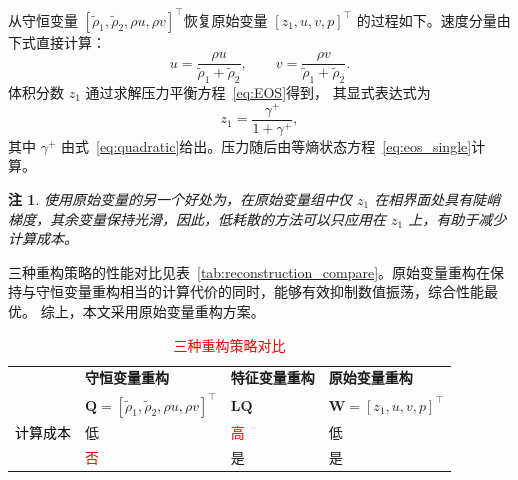 \documentclass[12pt,a4paper]{article}
\newtheorem{remark}[theorem]{注}
\numberwithin{equation}{section}    %
\begin{document}
从守恒变量 $[\tilde{\rho}_1, \tilde{\rho}_2, \rho u, \rho v]^\top$恢复原始变量 $[z_1, u, v, p]^\top$ 的过程如下。速度分量由下式直接计算：
\begin{equation}
    u = \frac{\rho u}{\tilde{\rho}_1 + \tilde{\rho}_2},
    \qquad
    v = \frac{\rho v}{\tilde{\rho}_1 + \tilde{\rho}_2}.
\end{equation}
体积分数 $z_1$ 通过求解压力平衡方程~\eqref{eq:EOS}得到，
其显式表达式为
\begin{equation}
    z_1 = \frac{\gamma^+}{1 + \gamma^+},
\end{equation}
其中 $\gamma^+$ 由式~\eqref{eq:quadratic}给出。压力随后由等熵状态方程~\eqref{eq:eos_single}计算。


\begin{remark}
   使用原始变量的另一个好处为，在原始变量组中仅 $z_1$ 在相界面处具有陡峭梯度，其余变量保持光滑，因此，低耗散的方法可以只应用在 $z_1$ 上，有助于减少计算成本。
\end{remark}

三种重构策略的性能对比见表~\autoref{tab:reconstruction_compare}。原始变量重构在保持与守恒变量重构相当的计算代价的同时，能够有效抑制数值振荡，综合性能最优。
综上，本文采用原始变量重构方案。

\begin{table}[!htpb]
  \small
  \centering
  \caption{\textcolor{red}{三种重构策略对比}}          %
  \label{tab:reconstruction_compare}  %
  \renewcommand{\arraystretch}{1.3}
  \begin{tabularx}{\linewidth}{
    >{\centering\arraybackslash}X
    >{\centering\arraybackslash}X
    >{\centering\arraybackslash}X
    >{\centering\arraybackslash}X}
  \toprule
  & \textbf{守恒变量重构} & \textbf{特征变量重构} & \textbf{原始变量重构} \\
  & $\bm{Q} = [\tilde{\rho}_1,\tilde{\rho}_2,\rho u,\rho v]^\top$ & $\bm{L}\bm{Q}$ & $\bm{W} = [z_1, u, v, p]^\top$ \\
  \midrule
  {\textcolor{black}{计算成本}}
  & {\textcolor{green!60!black}{低}}
  & {\textcolor{red}{高}}
  & {\textcolor{green!60!black}{低}} \\
  {\textcolor{black}{能否抑制振荡}}
  & {\textcolor{red}{否}}
  & {\textcolor{green!60!black}{是}}
  & {\textcolor{green!60!black}{是}} \\
  \bottomrule
  \end{tabularx}
\end{table}
\end{document}
